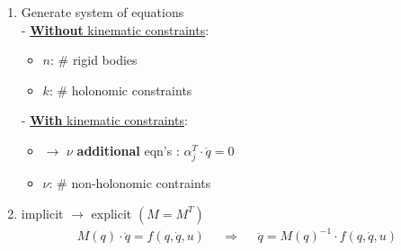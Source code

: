 \begin{enumerate}
\begin{minipage}{0.5\linewidth}
\begin{itemize}
                \end{itemize}
            \end{minipage}
            \vspace{2pt}
        \item Generate system of equations\\
            - \underline{\textbf{Without} kinematic constraints}:
            \vspace{-4pt}
            \vspace{-10pt}
            \begin{itemize}
                \item[] $n$: \# rigid bodies
                \item[] $k$: \# holonomic constraints 
            \end{itemize}
            - \underline{\textbf{With} kinematic constraints}:
            \vspace{-4pt}
            \vspace{-2em}
            \vspace{-10pt}
            \begin{itemize}
                \item[] $\to$ $\nu$ \textbf{additional} eqn's :  $\alpha^T_j \cdot \ddot{q} = 0$
                \item[] $\nu$: \# non-holonomic contraints
            \end{itemize}

        \item implicit $\rightarrow$ explicit \hfill $\left(M = M^T\right)$
            \begin{align*}
                M(q) \cdot \ddot{q} = f(q,\dot{q},u)&  &\Rightarrow& &\ddot{q} =  M(q)^{-1} \cdot f(q,\dot{q},u)
            \end{align*}
        \vfill \null

    \end{enumerate}